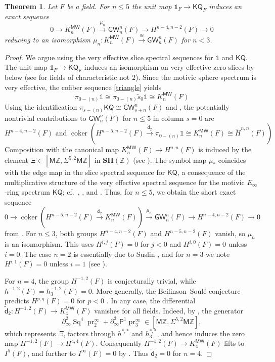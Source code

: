\documentclass[11pt,hyp,english]{article}
\newcommand{\Z}{\mathbb{Z}}
\newcommand{\unit}{\mathds{1}}
\newcommand{\KQ}{\mathsf{KQ}}
\newcommand{\GW}{\mathsf{GW}}
\newcommand{\MZ}{\mathsf{M}\Z}
\newcommand{\SH}{\mathbf{SH}}
\newcommand{\Sq}{\operatorname{Sq}}
\newcommand{\coker}{\operatorname{coker}}
\newcommand{\pr}{\operatorname{pr}}
\newcommand{\MW}{{\mathsf{MW}}}
\newcommand{\vd}{{\tilde{\mathsf{d}}}}
\newtheorem{theorem}{Theorem}[section]
\theoremstyle{definition}
\begin{document}
\begin{theorem}
\label{thm:symb-iso}
Let $F$ be a field.
For $n\leq 5$ the unit map $\unit_F\rightarrow\KQ_F$ induces an exact sequence 
\[
0
\to
K_n^{\MW}(F)
\xrightarrow{\mu_{n}} 
\GW_n^{n}(F)\to H^{n-4,n-2}(F)
\to 0
\]
reducing to an isomorphism
$
\mu_n\colon 
K_n^{\MW}(F) 
\xrightarrow{\cong}
\GW_n^{n}(F)
$
for $n<3$.
\end{theorem}
\begin{proof}
We argue using the very effective slice spectral sequences for $\unit$ and $\KQ$.
The unit map $\unit_F\to \KQ_F$ induces an isomorphism on very effective zero slices by 
 below 
(see \cite[Theorem 3.30]{2020arXiv200506778B} for fields of characteristic not $2$).
Since the motivic sphere spectrum is very effective, the cofiber sequence \eqref{triangle} yields
\[
\pi_{0-(n)}\unit
\cong 
\pi_{0-(n)}\tilde{s}_{0}\unit
\cong
K_n^{\MW}(F)
\]
Using the identification $\pi_{s-(n)}\KQ\cong\GW_{s+n}^{n}(F)$ and , the potentially nontrivial contributions to $\GW_n^{n}(F)$ for $n\leq 5$ in column $s=0$ are
\[
H^{n-4,n-2}(F)
\text{ and }
\coker\!\left(H^{n-5,n-2}(F)\xrightarrow{\vd_2}\pi_{0-(n)}\unit \cong K_n^{\MW}(F)\cong \widetilde{H}^{n,n}(F)\right)
\]
Composition with the canonical map $K_n^{\MW}(F)\to H^{n,n}(F)$ is induced by the element 
$\Xi\in [\MZ,\Sigma^{5,2}\MZ]$ in $\SH(\Z)$ (see ).
The symbol map $\mu_*$ coincides with the edge map in the slice spectral sequence for $\KQ$, a consequence of the multiplicative structure of the very effective spectral sequence for the motivic $E_\infty$-ring spectrum $\KQ$; cf.~\cite[Remark~4]{KO-map}, \cite{grso}, and \cite[Theorem~3.6.16]{zbMATH05870074}.
Thus, for $n\leq 5$, we obtain the short exact sequence
\[
0
\to
\coker 
(H^{n-5,n-2}(F) 
\xrightarrow{\vd_2}
K_n^{\MW}(F))
\xrightarrow{\mu_{n}} 
\GW_n^{n}(F)\to H^{n-4,n-2}(F)
\to 0
\]
from .
For $n\leq 3$, both groups $H^{n-4,n-2}(F)$ and $H^{n-5,n-2}(F)$ vanish, so $\mu_n$ is an isomorphism. 
This uses $H^{i,j}(F)=0$ for $j<0$ and $H^{i,0}(F)=0$ unless $i=0$.
The case $n=2$ is essentially due to Suslin \cite[Theorem~4.1.11]{KO-map}, 
and for $n=3$ we note $H^{i,1}(F)=0$ unless $i=1$ (see \cite[Lecture~4]{zbMATH05051055}).


For $n=4$, the group $H^{-1,2}(F)$ is conjecturally trivial, while $h^{-1,2}(F)=h^{-1,2}_3(F)=0$. 
More generally, the Beilinson--Soul{\'e} conjecture predicts $H^{p,q}(F)=0$ for $p<0$ \cite[Preface]{zbMATH05051055}.
In any case, the differential $\vd_2\colon H^{-1,2}(F)\to K^{\MW}_4(F)$ vanishes for all fields.
Indeed, by , the generator 
\[
\partial^2_\infty\Sq^4\pr^\infty_2+\partial^3_\infty\mathsf{P}^1\pr^\infty_3\in [\MZ,\Sigma^{5,2}\MZ],
\]
which represents $\Xi$, factors through $h^{*,*}$ and $h^{*,*}_3$, and hence induces the zero map $H^{-1,2}(F)\to H^{4,4}(F)$.
Consequently $H^{-1,2}(F)\to K^{\MW}_4(F)$ lifts to $I^5(F)$, and further to $I^\infty(F)=0$ by \cite{arason-pfister}.
Thus $\vd_2=0$ for $n=4$.


\end{proof}
\end{document}
